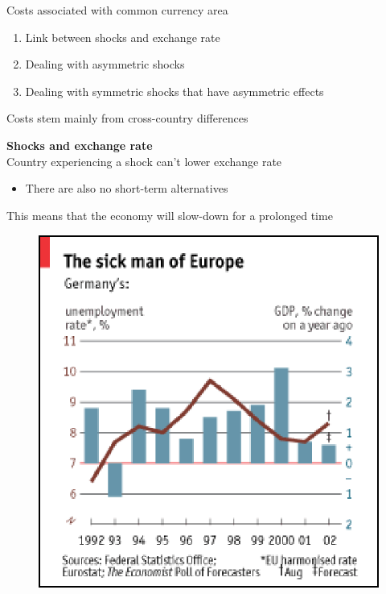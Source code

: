 \documentclass{beamer}
\begin{document}
\begin{frame}
  Costs associated with common currency area
  \begin{enumerate}
    \item Link between shocks and exchange rate
    \item Dealing with asymmetric shocks
    \item Dealing with symmetric shocks that have asymmetric effects
  \end{enumerate}
  \medskip
  Costs stem mainly from cross-country differences
\end{frame}

\begin{frame}
  \textbf{Shocks and exchange rate}\\
  Country experiencing a shock can't lower exchange rate
  \begin{itemize}
    \item There are also no short-term alternatives
  \end{itemize}
  This means that the economy will slow-down for a prolonged time  
  \begin{figure}
    \includegraphics[scale=.4]{sick_man.eps}
  \end{figure}
\end{frame}
\end{document}
